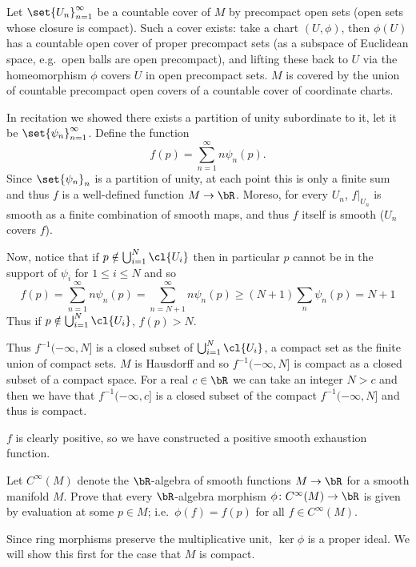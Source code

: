     \item Let $\set{U_n}_{n=1}^\infty$ be a countable cover of $M$ by precompact open sets (open sets whose
    closure is compact).
    Such a cover exists: take a chart $(U,\phi)$, then $\phi(U)$ has a countable open cover of proper
    precompact sets (as a subspace of Euclidean space, e.g.\ open balls are open precompact), and lifting
    these back to $U$ via the homeomorphism $\phi$ covers $U$ in open precompact sets.
    $M$ is covered by the union of countable precompact open covers of a countable cover of coordinate charts.

    In recitation we showed there exists a partition of unity subordinate to it, let it be
    $\set{\psi_n}_{n=1}^\infty$.
    Define the function
    $$ f(p) = \sum_{n=1}^\infty n\psi_n(p) . $$
    Since $\set{\psi_n}_n$ is a partition of unity, at each point this is only a finite sum and thus $f$ is
    a well-defined function $M\to\bR$.
    Moreso, for every $U_n$, $f|_{U_n}$ is smooth as a finite combination of smooth maps, and thus $f$ itself
    is smooth ($U_n$ covers $f$).

    Now, notice that if $p\notin\bigcup_{i=1}^N\cl{U_i}$ then in particular $p$ cannot be in the support of
    $\psi_i$ for $1\leq i\leq N$ and so
    $$ f(p) = \sum_{n=1}^\infty n\psi_n(p) = \sum_{n=N+1}^\infty n\psi_n(p) \geq (N+1)\sum_n\psi_n(p) = N+1 $$
    Thus if $p\notin\bigcup_{i=1}^N\cl{U_i}$, $f(p)>N$.

    Thus $f^{-1}(-\infty,N]$ is a closed subset of $\bigcup_{i=1}^N\cl{U_i}$, a compact set as the finite
    union of compact sets.
    $M$ is Hausdorff and so $f^{-1}(-\infty,N]$ is compact as a closed subset of a compact space.
    For a real $c\in\bR$ we can take an integer $N>c$ and then we have that $f^{-1}(-\infty,c]$ is a closed
    subset of the compact $f^{-1}(-\infty,N]$ and thus is compact.

    $f$ is clearly positive, so we have constructed a positive smooth exhaustion function.
\eenum

\bprob

    Let $C^\infty(M)$ denote the $\bR$-algebra of smooth functions $M\to\bR$ for a smooth manifold $M$.
    Prove that every $\bR$-algebra morphism $\phi\colon C^\infty(M)\to\bR$ is given by evaluation at some
    $p\in M$; i.e.\ $\phi(f)=f(p)$ for all $f\in C^\infty(M)$.

\eprob

Since ring morphisms preserve the multiplicative unit, $\ker\phi$ is a proper ideal.
We will show this first for the case that $M$ is compact.

